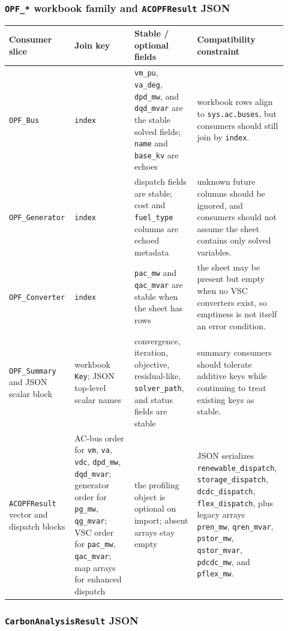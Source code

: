 \subsubsection*{\texttt{OPF\_*} workbook family and \texttt{ACOPFResult} JSON}

\begin{longtable}{@{}L{0.19\linewidth}L{0.21\linewidth}L{0.22\linewidth}L{0.30\linewidth}@{}}
\toprule
Consumer slice & Join key & Stable / optional fields & Compatibility constraint \\
\midrule
\endhead
\texttt{OPF\_Bus} & \texttt{index} & \texttt{vm\_pu}, \texttt{va\_deg}, \texttt{dpd\_mw}, and \texttt{dqd\_mvar} are the stable solved fields; \texttt{name} and \texttt{base\_kv} are echoes & workbook rows align to \texttt{sys.ac.buses}, but consumers should still join by \texttt{index}. \\
\texttt{OPF\_Generator} & \texttt{index} & dispatch fields are stable; cost and \texttt{fuel\_type} columns are echoed metadata & unknown future columns should be ignored, and consumers should not assume the sheet contains only solved variables. \\
\texttt{OPF\_Converter} & \texttt{index} & \texttt{pac\_mw} and \texttt{qac\_mvar} are stable when the sheet has rows & the sheet may be present but empty when no VSC converters exist, so emptiness is not itself an error condition. \\
\texttt{OPF\_Summary} and JSON scalar block & workbook \texttt{Key}; JSON top-level scalar names & convergence, iteration, objective, residual-like, \texttt{solver\_path}, and status fields are stable & summary consumers should tolerate additive keys while continuing to treat existing keys as stable. \\
\texttt{ACOPFResult} vector and dispatch blocks & AC-bus order for \texttt{vm}, \texttt{va}, \texttt{vdc}, \texttt{dpd\_mw}, \texttt{dqd\_mvar}; generator order for \texttt{pg\_mw}, \texttt{qg\_mvar}; VSC order for \texttt{pac\_mw}, \texttt{qac\_mvar}; map arrays for enhanced dispatch & the profiling object is optional on import; absent arrays stay empty & JSON serializes \texttt{renewable\_dispatch}, \texttt{storage\_dispatch}, \texttt{dcdc\_dispatch}, \texttt{flex\_dispatch}, plus legacy arrays \texttt{pren\_mw}, \texttt{qren\_mvar}, \texttt{pstor\_mw}, \texttt{qstor\_mvar}, \texttt{pdcdc\_mw}, and \texttt{pflex\_mw}. \\
\bottomrule
\end{longtable}

\subsubsection*{\texttt{CarbonAnalysisResult} JSON}

